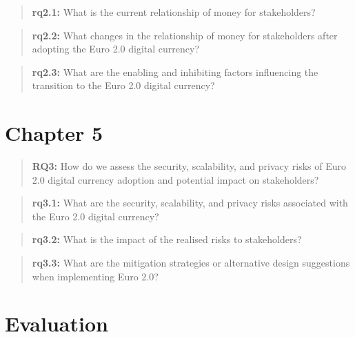 \documentclass[12pt]{article} %
\begin{document}
{{\begin{quotation}
	\textbf{rq2.1:} What is the current relationship of money for stakeholders?
\end{quotation}
\begin{quotation}
	\textbf{rq2.2:} What changes in the relationship of money for stakeholders after adopting the Euro 2.0 digital currency?
\end{quotation}
\begin{quotation}
	\textbf{rq2.3:} What are the enabling and inhibiting factors influencing the transition to the Euro 2.0 digital currency?
\end{quotation}

\pagebreak

\section{Chapter 5} \label{sec:5}


\begin{quotation}
	\textbf{RQ3:} How do we assess the security, scalability, and privacy risks of Euro 2.0 digital currency adoption and potential impact on stakeholders?
\end{quotation}

\begin{quotation}
	\textbf{rq3.1:} What are the security, scalability, and privacy risks associated with the Euro 2.0 digital currency?
\end{quotation}
\begin{quotation}
	\textbf{rq3.2:} What is the impact of the realised risks to stakeholders?
\end{quotation}
\begin{quotation}
	\textbf{rq3.3:} What are the mitigation strategies or alternative design suggestions when implementing Euro 2.0?
\end{quotation}

\pagebreak

\section{Evaluation} \label{sec:6}


\pagebreak

}}
\end{document}
